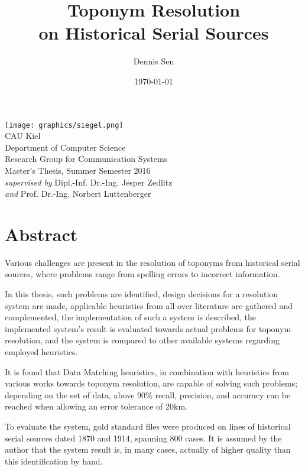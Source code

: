 \documentclass[11pt]{article}
\title{\textbf{Toponym Resolution\\on Historical Serial Sources\\}}
\author{Dennis Sen}
\date{\today}
\begin{document}
\maketitle
\thispagestyle{empty}

\begin{center}
\vspace{2cm}
\texttt{[image: graphics/siegel.png]}\\
CAU Kiel\\
Department of Computer Science\\
Research Group for Communication Systems\\
Master's Thesis, Summer Semester 2016\\
\emph{supervised by} Dipl.-Inf. Dr.-Ing. Jesper Zedlitz\\
 \emph{and} Prof. Dr.-Ing. Norbert Luttenberger
\end{center}

\newpage
\section*{Abstract}
\setcounter{page}{1}
Various challenges are present in the resolution of toponyms from historical serial sources, where problems range from spelling errors to incorrect information.

In this thesis, such problems are identified, design decisions for a resolution system are made, applicable heuristics from all over literature are gathered and complemented, the implementation of such a system is described, the implemented system's result is evaluated towards actual problems for toponym resolution, and the system is compared to other available systems regarding employed heuristics.

It is found that Data Matching heuristics, in combination with heuristics from various works towards toponym resolution, are capable of solving such problems; depending on the set of data, above 90\% recall, precision, and accuracy can be reached when allowing an error tolerance of 20km.

To evaluate the system, gold standard files were produced on lines of historical serial sources dated 1870 and 1914, spanning 800 cases. It is assumed by the author that the system result is, in many cases, actually of higher quality than this identification by hand.
\end{document}
